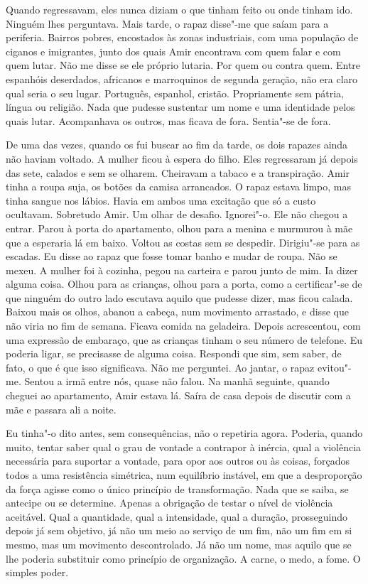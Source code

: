 Quando regressavam, eles nunca diziam o que tinham feito ou onde tinham
ido. Ninguém lhes perguntava. Mais tarde, o rapaz disse"-me que saíam
para a periferia. Bairros pobres, encostados às zonas industriais, com
uma população de ciganos e imigrantes, junto dos quais Amir encontrava
com quem falar e com quem lutar. Não me disse se ele próprio lutaria.
Por quem ou contra quem. Entre espanhóis deserdados, africanos e
marroquinos de segunda geração, não era claro qual seria o seu lugar.
Português, espanhol, cristão. Propriamente sem pátria, língua ou
religião. Nada que pudesse sustentar um nome e uma identidade pelos
quais lutar. Acompanhava os outros, mas ficava de fora. Sentia"-se de
fora.

De uma das vezes, quando os fui buscar ao fim da tarde, os dois rapazes
ainda não haviam voltado. A mulher ficou à espera do filho. Eles
regressaram já depois das sete, calados e sem se olharem. Cheiravam a
tabaco e a transpiração. Amir tinha a roupa suja, os botões da camisa
arrancados. O rapaz estava limpo, mas tinha sangue nos lábios. Havia em
ambos uma excitação que só a custo ocultavam. Sobretudo Amir. Um olhar
de desafio. Ignorei"-o. Ele não chegou a entrar. Parou à porta do
apartamento, olhou para a menina e murmurou à mãe que a esperaria lá em
baixo. Voltou as costas sem se despedir. Dirigiu"-se para as escadas. Eu
disse ao rapaz que fosse tomar banho e mudar de roupa. Não se mexeu. A
mulher foi à cozinha, pegou na carteira e parou junto de mim. Ia dizer
alguma coisa. Olhou para as crianças, olhou para a porta, como a
certificar"-se de que ninguém do outro lado escutava aquilo que pudesse
dizer, mas ficou calada. Baixou mais os olhos, abanou a cabeça, num
movimento arrastado, e disse que não viria no fim de semana. Ficava
comida na geladeira. Depois acrescentou, com uma expressão de
embaraço, que as crianças tinham o seu número de telefone. Eu poderia
ligar, se precisasse de alguma coisa. Respondi que sim, sem saber, de
fato, o que é que isso significava. Não me perguntei. Ao jantar, o
rapaz evitou"-me. Sentou a irmã entre nós, quase não falou. Na manhã
seguinte, quando cheguei ao apartamento, Amir estava lá. Saíra de casa
depois de discutir com a mãe e passara ali a noite.

Eu tinha"-o dito antes, sem consequências, não o repetiria agora.
Poderia, quando muito, tentar saber qual o grau de vontade a contrapor à
inércia, qual a violência necessária para suportar a vontade, para opor
aos outros ou às coisas, forçados todos a uma resistência simétrica, num
equilíbrio instável, em que a desproporção da força agisse como o único
princípio de transformação. Nada que se saiba, se antecipe ou se
determine. Apenas a obrigação de testar o nível de violência aceitável.
Qual a quantidade, qual a intensidade, qual a duração, prosseguindo
depois já sem objetivo, já não um meio ao serviço de um fim, não um fim
em si mesmo, mas um movimento descontrolado. Já não um nome, mas aquilo
que se lhe poderia substituir como princípio de organização. A carne, o
medo, a fome. O simples poder.

